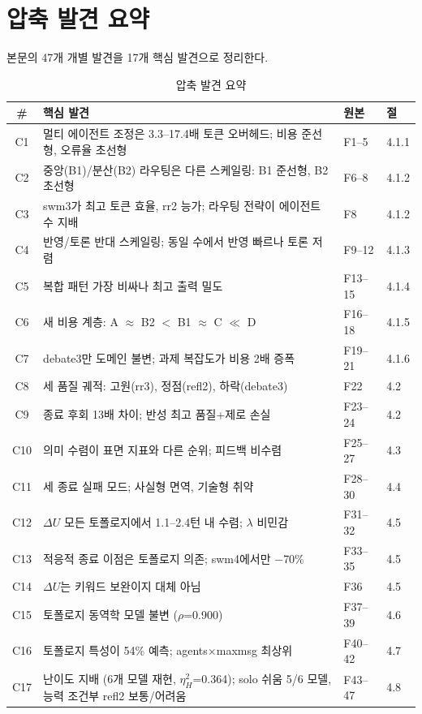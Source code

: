 \documentclass[a4paper,11pt]{article}
\begin{document}
\section{압축 발견 요약}
\label{app:compressed}

본문의 47개 개별 발견을 17개 핵심 발견으로 정리한다.

\begin{table}[H]
\centering
\caption{압축 발견 요약}
\label{tab:compressed-findings}
{\footnotesize
\begin{tabular}{clll}
\toprule
\# & 핵심 발견 & 원본 & 절 \\
\midrule
C1  & 멀티 에이전트 조정은 3.3--17.4배 토큰 오버헤드; 비용 준선형, 오류율 초선형 & F1--5 & 4.1.1 \\
C2  & 중앙(B1)/분산(B2) 라우팅은 다른 스케일링: B1 준선형, B2 초선형 & F6--8 & 4.1.2 \\
C3  & swm3가 최고 토큰 효율, rr2 능가; 라우팅 전략이 에이전트 수 지배 & F8 & 4.1.2 \\
C4  & 반영/토론 반대 스케일링; 동일 수에서 반영 빠르나 토론 저렴 & F9--12 & 4.1.3 \\
C5  & 복합 패턴 가장 비싸나 최고 출력 밀도 & F13--15 & 4.1.4 \\
C6  & 새 비용 계층: A $\approx$ B2 $<$ B1 $\approx$ C $\ll$ D & F16--18 & 4.1.5 \\
C7  & debate3만 도메인 불변; 과제 복잡도가 비용 2배 증폭 & F19--21 & 4.1.6 \\
C8  & 세 품질 궤적: 고원(rr3), 정점(refl2), 하락(debate3) & F22 & 4.2 \\
C9  & 종료 후회 13배 차이; 반성 최고 품질+제로 손실 & F23--24 & 4.2 \\
C10 & 의미 수렴이 표면 지표와 다른 순위; 피드백 비수렴 & F25--27 & 4.3 \\
C11 & 세 종료 실패 모드; 사실형 면역, 기술형 취약 & F28--30 & 4.4 \\
C12 & $\Delta U$ 모든 토폴로지에서 1.1--2.4턴 내 수렴; $\lambda$ 비민감 & F31--32 & 4.5 \\
C13 & 적응적 종료 이점은 토폴로지 의존; swm4에서만 $-$70\% & F33--35 & 4.5 \\
C14 & $\Delta U$는 키워드 보완이지 대체 아님 & F36 & 4.5 \\
C15 & 토폴로지 동역학 모델 불변 ($\rho$=0.900) & F37--39 & 4.6 \\
C16 & 토폴로지 특성이 54\% 예측; agents$\times$maxmsg 최상위 & F40--42 & 4.7 \\
C17 & 난이도 지배 (6개 모델 재현, $\eta^{2}_{H}$=0.364); solo 쉬움 5/6 모델, 능력 조건부 refl2 보통/어려움 & F43--47 & 4.8 \\
\bottomrule
\end{tabular}
}
\end{table}
\end{document}
